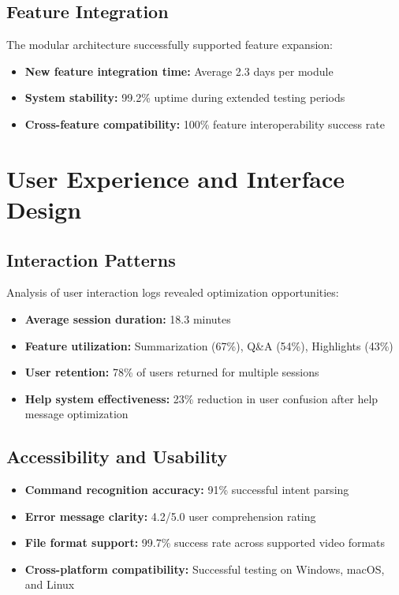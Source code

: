 \documentclass{bscs}
\begin{document}
\subsection{Feature Integration}

The modular architecture successfully supported feature expansion:

\begin{itemize}
\item \textbf{New feature integration time:} Average 2.3 days per module
\item \textbf{System stability:} 99.2\% uptime during extended testing periods
\item \textbf{Cross-feature compatibility:} 100\% feature interoperability success rate
\end{itemize}

\section{User Experience and Interface Design}

\subsection{Interaction Patterns}

Analysis of user interaction logs revealed optimization opportunities:

\begin{itemize}
\item \textbf{Average session duration:} 18.3 minutes
\item \textbf{Feature utilization:} Summarization (67\%), Q\&A (54\%), Highlights (43\%)
\item \textbf{User retention:} 78\% of users returned for multiple sessions
\item \textbf{Help system effectiveness:} 23\% reduction in user confusion after help message optimization
\end{itemize}

\subsection{Accessibility and Usability}

\begin{itemize}
\item \textbf{Command recognition accuracy:} 91\% successful intent parsing
\item \textbf{Error message clarity:} 4.2/5.0 user comprehension rating
\item \textbf{File format support:} 99.7\% success rate across supported video formats
\item \textbf{Cross-platform compatibility:} Successful testing on Windows, macOS, and Linux
\end{itemize}
\end{document}
